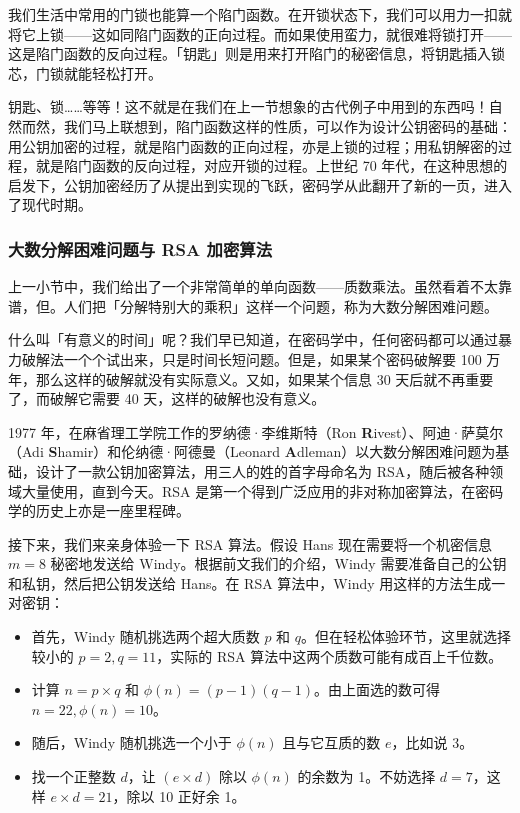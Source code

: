 我们生活中常用的门锁也能算一个陷门函数。在开锁状态下，我们可以用力一扣就将它上锁——这如同陷门函数的正向过程。而如果使用蛮力，就很难将锁打开——这是陷门函数的反向过程。「钥匙」则是用来打开陷门的秘密信息，将钥匙插入锁芯，门锁就能轻松打开。

钥匙、锁……等等！这不就是在我们在上一节想象的古代例子中用到的东西吗！自然而然，我们马上联想到，陷门函数这样的性质，可以作为设计公钥密码的基础：用公钥加密的过程，就是陷门函数的正向过程，亦是上锁的过程；用私钥解密的过程，就是陷门函数的反向过程，对应开锁的过程。上世纪 70 年代，在这种思想的启发下，公钥加密经历了从提出到实现的飞跃，密码学从此翻开了新的一页，进入了现代时期。

\subsubsection{大数分解困难问题与 RSA 加密算法}

上一小节中，我们给出了一个非常简单的单向函数——质数乘法。虽然看着不太靠谱，但。人们把「分解特别大的乘积」这样一个问题，称为大数分解困难问题。

\begin{note}
  什么叫「有意义的时间」呢？我们早已知道，在密码学中，任何密码都可以通过暴力破解法一个个试出来，只是时间长短问题。但是，如果某个密码破解要 100 万年，那么这样的破解就没有实际意义。又如，如果某个信息 30 天后就不再重要了，而破解它需要 40 天，这样的破解也没有意义。
\end{note}

1977 年，在麻省理工学院工作的罗纳德·李维斯特（Ron \textbf{R}ivest）、阿迪·萨莫尔（Adi \textbf{S}hamir）和伦纳德·阿德曼（Leonard \textbf{A}dleman）以大数分解困难问题为基础，设计了一款公钥加密算法，用三人的姓的首字母命名为 RSA，随后被各种领域大量使用，直到今天。RSA 是第一个得到广泛应用的非对称加密算法，在密码学的历史上亦是一座里程碑。

接下来，我们来亲身体验一下 RSA 算法。假设 Hans 现在需要将一个机密信息 $m=8$ 秘密地发送给 Windy。根据前文我们的介绍，Windy 需要准备自己的公钥和私钥，然后把公钥发送给 Hans。在 RSA 算法中，Windy 用这样的方法生成一对密钥：

\begin{itemize}
  \item 首先，Windy 随机挑选两个超大质数 $p$ 和 $q$。但在轻松体验环节，这里就选择较小的 $p=2,q=11$，实际的 RSA 算法中这两个质数可能有成百上千位数。
  \item 计算 $n=p\times q$ 和 $\phi(n)=(p-1)(q-1)$。由上面选的数可得 $n=22,\phi(n)=10$。
  \item 随后，Windy 随机挑选一个小于 $\phi(n)$ 且与它互质的数 $e$，比如说 3。
  \item 找一个正整数 $d$，让 $(e \times d)$ 除以 $\phi(n)$ 的余数为 1。不妨选择 $d=7$，这样 $e \times d = 21$，除以 10 正好余 1。
\end{itemize}

